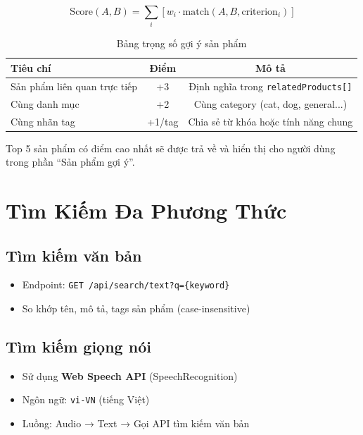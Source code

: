 \documentclass[12pt, a4paper]{report}
\begin{document}
\begin{equation}
    \text{Score}(A, B) = \sum_{i} \left[ w_i \cdot \text{match}(A, B, \text{criterion}_i) \right]
\end{equation}

\begin{table}[H]
    \centering
    \caption{Bảng trọng số gợi ý sản phẩm}
    \begin{tabular}{p{6cm}cc}
        \toprule
        \textbf{Tiêu chí} & \textbf{Điểm} & \textbf{Mô tả} \\
        \midrule
        Sản phẩm liên quan trực tiếp & +3 & Định nghĩa trong \texttt{relatedProducts[]} \\
        Cùng danh mục & +2 & Cùng category (cat, dog, general...) \\
        Cùng nhãn tag & +1/tag & Chia sẻ từ khóa hoặc tính năng chung \\
        \bottomrule
    \end{tabular}
\end{table}

\begin{infobox}
Top 5 sản phẩm có điểm cao nhất sẽ được trả về và hiển thị cho người dùng trong phần ``Sản phẩm gợi ý''.
\end{infobox}

\section{Tìm Kiếm Đa Phương Thức}

\subsection{Tìm kiếm văn bản}
\begin{itemize}
    \item Endpoint: \texttt{GET /api/search/text?q=\{keyword\}}
    \item So khớp tên, mô tả, tags sản phẩm (case-insensitive)
\end{itemize}

\subsection{Tìm kiếm giọng nói}
\begin{itemize}
    \item Sử dụng \textbf{Web Speech API} (SpeechRecognition)
    \item Ngôn ngữ: \texttt{vi-VN} (tiếng Việt)
    \item Luồng: Audio → Text → Gọi API tìm kiếm văn bản
\end{itemize}
\end{document}

